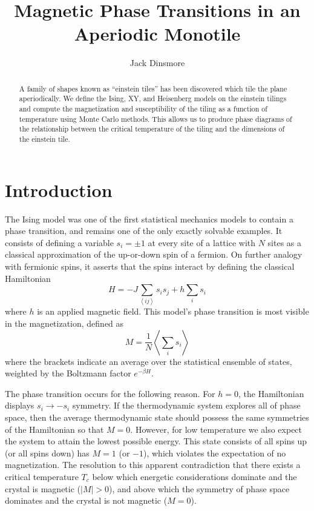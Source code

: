 \documentclass[amsmath,amssymb,aps,twocolumn,nofootinbib]{revtex4-2}
\newcommand{\braket}[1]{\left \langle #1 \right \rangle}
\begin{document}
\title{Magnetic Phase Transitions in an Aperiodic Monotile}
\author{Jack Dinsmore}

\begin{abstract}
  A family of shapes known as ``einstein tiles'' has been discovered which tile the plane aperiodically. We define the Ising, XY, and Heisenberg models on the einstein tilings and compute the magnetization and susceptibility of the tiling as a function of temperature using Monte Carlo methods. This allows us to produce phase diagrams of the relationship between the critical temperature of the tiling and the dimensions of the einstein tile.
\end{abstract}

\maketitle

\section{Introduction}
The Ising model was one of the first statistical mechanics models to contain a phase transition, and remains one of the only exactly solvable examples. It consists of defining a variable $s_i = \pm 1$ at every site of a lattice with $N$ sites as a classical approximation of the up-or-down spin of a fermion. On further analogy with fermionic spins, it asserts that the spins interact by defining the classical Hamiltonian
\begin{equation}
  H = -J \sum_{\braket{ij}} s_i s_j + h \sum_i s_i
  \label{eqn:ising}
\end{equation}
where $h$ is an applied magnetic field. This model's phase transition is most visible in the magnetization, defined as
\begin{equation}
  M = \frac{1}{N}\braket{\sum_{i} s_i}
  \label{eqn:magnetization}
\end{equation}
where the brackets indicate an average over the statistical ensemble of states, weighted by the Boltzmann factor $e^{-\beta H}$.

The phase transition occurs for the following reason. For $h=0$, the Hamiltonian displays $s_i\rightarrow -s_i$ symmetry. If the thermodynamic system explores all of phase space, then the average thermodynamic state should possess the same symmetries of the Hamiltonian so that $M=0$. However, for low temperature we also expect the system to attain the lowest possible energy. This state consists of all spins up (or all spins down) has $M = 1$ (or $-1$), which violates the expectation of no magnetization. The resolution to this apparent contradiction that there exists a critical temperature $T_c$ below which energetic considerations dominate and the crystal is magnetic ($|M|>0$), and above which the symmetry of phase space dominates and the crystal is not magnetic ($M = 0$).
\end{document}
